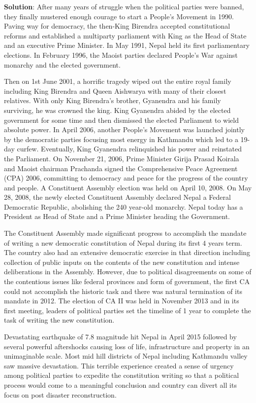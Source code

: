 \documentclass[
  openany]{book}
\newenvironment{solution}{ {\bfseries Solution}:}{}
\begin{document}
\begin{questions}
\begin{solution}
After many years of struggle when the political parties were banned, they finally mustered enough courage to start a People’s Movement in 1990. Paving way for democracy, the then-King Birendra accepted constitutional reforms and established a multiparty parliament with King as the Head of State and an executive Prime Minister. In May 1991, Nepal held its first parliamentary elections. In February 1996, the Maoist parties declared People’s War against monarchy and the elected government.

Then on 1st June 2001, a horrific tragedy wiped out the entire royal family including King Birendra and Queen Aishwarya with many of their closest relatives. With only King Birendra’s brother, Gyanendra and his family surviving, he was crowned the king. King Gyanendra abided by the elected government for some time and then dismissed the elected Parliament to wield absolute power. In April 2006, another People’s Movement was launched jointly by the democratic parties focusing most energy in Kathmandu which led to a 19-day curfew. Eventually, King Gyanendra relinquished his power and reinstated the Parliament. On November 21, 2006, Prime Minister Girija Prasad Koirala and Maoist chairman Prachanda signed the Comprehensive Peace Agreement (CPA) 2006, committing to democracy and peace for the progress of the country and people. A Constituent Assembly election was held on April 10, 2008. On May 28, 2008, the newly elected Constituent Assembly declared Nepal a Federal Democratic Republic, abolishing the 240 year-old monarchy. Nepal today has a President as Head of State and a Prime Minister heading the Government.

The Constituent Assembly made significant progress to accomplish the mandate of writing a new democratic constitution of Nepal during its first 4 years term. The country also had an extensive democratic exercise in that direction including collection of public inputs on the contents of the new constitution and intense deliberations in the Assembly. However, due to political disagreements on some of the contentious issues like federal provinces and form of government, the first CA could not accomplish the historic task and there was natural termination of its mandate in 2012. The election of CA II was held in November 2013 and in its first meeting, leaders of political parties set the timeline of 1 year to complete the task of writing the new constitution.

Devastating earthquake of 7.8 magnitude hit Nepal in April 2015 followed by several powerful aftershocks causing loss of life, infrastructure and property in an unimaginable scale. Most mid hill districts of Nepal including Kathmandu valley saw massive devastation. This terrible experience created a sense of urgency among political parties to expedite the constitution writing so that a political process would come to a meaningful conclusion and country can divert all its focus on post disaster reconstruction.


\end{solution}
\end{questions}
\end{document}
